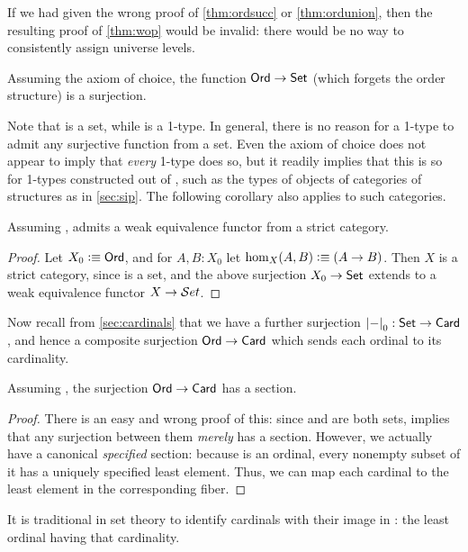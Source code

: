 \begin{rmk}
  If we had given the wrong proof of \autoref{thm:ordsucc} or \autoref{thm:ordunion}, then the resulting proof of \autoref{thm:wop} would be invalid: there would be no way to consistently assign universe levels.
\end{rmk}

\begin{cor}
  Assuming the axiom of choice, the function $\mathsf{Ord}\to\mathsf{Set}$ (which forgets the order structure) is a surjection.
\end{cor}

Note that \ord is a set, while \set is a 1-type.
In general, there is no reason for a 1-type to admit any surjective function from a set.
Even the axiom of choice does not appear to imply that \emph{every} 1-type does so, but it readily implies that this is so for 1-types constructed out of \set, such as the types of objects of categories of structures as in \autoref{sec:sip}.
The following corollary also applies to such categories.

\begin{cor}
  Assuming \choice{}, \uset admits a weak equivalence functor from a strict category.
\end{cor}
\begin{proof}
  Let $X_0\vcentcolon\equiv \mathsf{Ord}$, and for $A,B:X_0$ let $\hom_X(A,B) \vcentcolon\equiv (A\to B)$.
  Then $X$ is a strict category, since \ord is a set, and the above surjection $X_0 \to \mathsf{Set}$ extends to a weak equivalence functor $X\to \mathcal{S}et$.
\end{proof}

Now recall from \autoref{sec:cardinals} that we have a further surjection $\mathopen{}\left|-\right|_{0}^{}\mathclose{}:\mathsf{Set}\to\mathsf{Card}$, and hence a composite surjection $\mathsf{Ord}\to\mathsf{Card}$ which sends each ordinal to its cardinality.

\begin{thm}
  Assuming \choice{}, the surjection $\mathsf{Ord}\to\mathsf{Card}$ has a section.
\end{thm}
\begin{proof}
  There is an easy and wrong proof of this: since \ord and \card are both sets, \choice{} implies that any surjection between them \emph{merely} has a section.
  However, we actually have a canonical \emph{specified} section: because \ord is an ordinal, every nonempty subset of it has a uniquely specified least element.
  Thus, we can map each cardinal to the least element in the corresponding fiber.
\end{proof}

It is traditional in set theory to identify cardinals with their image in \ord: the least ordinal having that cardinality.


